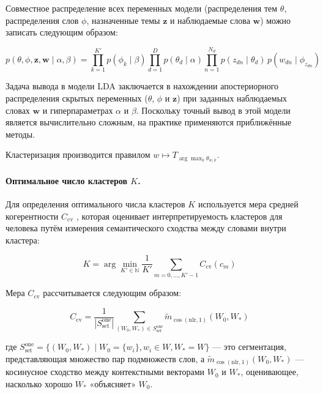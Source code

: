 \documentclass[14pt,a4paper]{article}
\begin{document}
Совместное распределение всех переменных модели (распределения тем $\theta$, распределения слов $\phi$, назначенные темы $\mathbf{z}$ и наблюдаемые слова $\mathbf{w}$) можно записать следующим образом:

\begin{equation}
p(\theta, \phi, \mathbf{z}, \mathbf{w} \mid \alpha, \beta) = \prod_{k=1}^{K'} p(\phi_k \mid \beta) \prod_{d=1}^D p(\theta_d \mid \alpha) \prod_{n=1}^{N_d} p(z_{dn} \mid \theta_d)\, p(w_{dn} \mid \phi_{z_{dn}})
\end{equation}


Задача вывода в модели LDA заключается в нахождении апостериорного распределения скрытых переменных ($\theta$, $\phi$ и $\mathbf{z}$) при заданных наблюдаемых словах $\mathbf{w}$ и гиперпараметрах $\alpha$ и $\beta$. Поскольку точный вывод в этой модели является вычислительно сложным, на практике применяются приближённые методы.


Кластеризация производится правилом
\(
  w\mapsto T_{\arg\max_{k}\theta_{w,k}}.
\)

\paragraph{Оптимальное число кластеров $K$.}

Для определения оптимального числа кластеров $K$ используется мера средней когерентности $C_{\text{cv}}$ \cite{roder2015exploring}, которая оценивает интерпретируемость кластеров для человека путём измерения семантического сходства между словами внутри кластера:

\begin{equation}
K = \arg\min_{K' \in \mathbb{N}} \frac{1}{K'} \sum_{m=0,...,K'-1} C_{\text{cv}}(c_m)
\end{equation}

Мера $C_{\text{cv}}$ рассчитывается следующим образом:

\begin{equation}
C_{\text{cv}} = \frac{1}{|S^{\text{one}}_{\text{set}}|} \sum_{(W_0, W_*) \in S^{\text{one}}_{\text{set}}} \tilde{m}_{\cos(\text{nlr}, 1)}(W_0, W_*)
\end{equation}

где $S^{\text{one}}_{\text{set}} = \{(W_0, W_*) \mid W_0 = \{w_i\}, w_i \in W, W_* = W\}$ — это сегментация, представляющая множество пар подмножеств слов, а $\tilde{m}_{\cos(\text{nlr}, 1)}(W_0, W_*)$ — косинусное сходство между контекстными векторами $W_0$ и $W_*$, оценивающее, насколько хорошо $W_*$ «объясняет» $W_0$.
\end{document}
